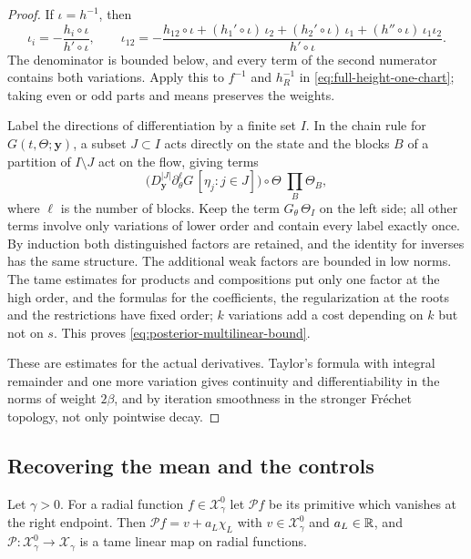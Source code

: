 \begin{proof}
If $\iota=h^{-1}$, then
\[
 \iota_i=-\frac{h_i\circ\iota}{h'\circ\iota},\qquad
 \iota_{12}=-\frac{h_{12}\circ\iota
 +(h_1'\circ\iota)\,\iota_2+(h_2'\circ\iota)\,\iota_1
 +(h''\circ\iota)\,\iota_1\iota_2}{h'\circ\iota} .
\]
The denominator is bounded below, and every term of the second
numerator contains both variations. Apply this to $f^{-1}$ and
$h_R^{-1}$ in \eqref{eq:full-height-one-chart}; taking even or odd
parts and means preserves the weights.

Label the directions of differentiation by a finite set $I$. In the
chain rule for $G(t,\Theta;\mathbf y)$, a subset $J\subset I$ acts
directly on the state and the blocks $B$ of a partition of
$I\setminus J$ act on the flow, giving terms
\[
 \bigl(D_{\mathbf y}^{|J|}\partial_\theta^{\ell}G\,
                   [\eta_j:j\in J]\bigr)\circ\Theta\;
                            \prod_{B}\Theta_B ,
\]
where $\ell$ is the number of blocks. Keep the term
$G_\theta\,\Theta_I$ on the left side; all other terms involve only
variations of lower order and contain every label exactly once. By
induction both distinguished factors are retained, and the identity
for inverses has the same structure. The additional weak factors are
bounded in low norms. The tame estimates for products and
compositions put only one factor at the high order, and the formulas
for the coefficients, the regularization at the roots and the
restrictions have fixed order; $k$ variations add a cost depending on
$k$ but not on $s$. This proves
\eqref{eq:posterior-multilinear-bound}.

These are estimates for the actual derivatives. Taylor's formula with
integral remainder and one more variation gives continuity and
differentiability in the norms of weight $2\beta$, and by iteration
smoothness in the stronger Fr\'echet topology, not only pointwise
decay.
\end{proof}

\subsection{Recovering the mean and the controls}

\begin{lemma}
\label{lem:weighted-primitive}
Let $\gamma>0$. For a radial function $f\in\mathcal X^0_\gamma$ let
$\mathscr Pf$ be its primitive which vanishes at the right endpoint.
Then $\mathscr Pf=v+a_L\chi_L$ with $v\in\mathcal X^0_\gamma$ and
$a_L\in\mathbb R$, and $\mathscr P:\mathcal X^0_\gamma\to\mathcal X_\gamma$
is a tame linear map on radial functions.
\end{lemma}


